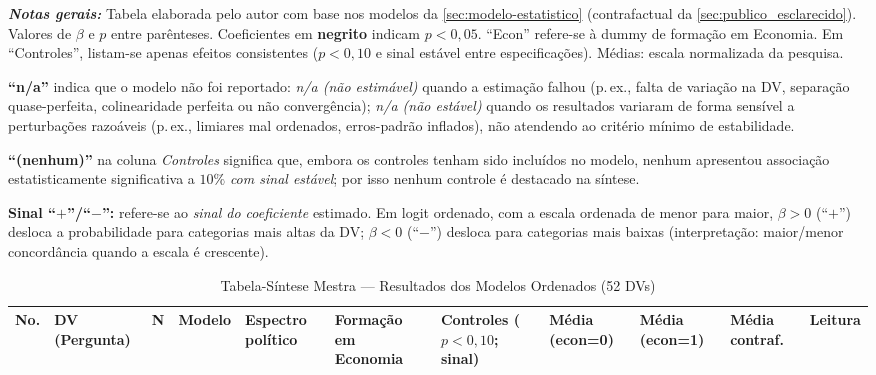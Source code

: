 \begin{apendicesenv}
\begin{landscape}
\begin{ThreePartTable}
\begin{TableNotes}[flushleft]\footnotesize
\item \textit{\textbf{Notas gerais:}} Tabela elaborada pelo autor com base nos modelos da \autoref{sec:modelo-estatistico} (contrafactual da \autoref{sec:publico_esclarecido}). \newline Valores de $\beta$ e $p$ entre parênteses. Coeficientes em \textbf{negrito} indicam $p<0{,}05$. ``Econ'' refere-se à dummy de formação em Economia. Em ``Controles'', listam-se apenas efeitos consistentes ($p<0{,}10$ e sinal estável entre especificações). Médias: escala normalizada da pesquisa.
\item \textbf{``n/a''} indica que o modelo não foi reportado: \textit{n/a (não estimável)} quando a estimação falhou (p.\,ex., falta de variação na DV, separação quase-perfeita, colinearidade perfeita ou não convergência); \textit{n/a (não estável)} quando os resultados variaram de forma sensível a perturbações razoáveis (p.\,ex., limiares mal ordenados, erros-padrão inflados), não atendendo ao critério mínimo de estabilidade.
\item \textbf{``(nenhum)''} na coluna \emph{Controles} significa que, embora os controles tenham sido incluídos no modelo, nenhum apresentou associação estatisticamente significativa a $10\%$ \emph{com sinal estável}; por isso nenhum controle é destacado na síntese.
\item \textbf{Sinal ``$+$''/``$-$'':} refere-se ao \emph{sinal do coeficiente} estimado. Em logit ordenado, com a escala ordenada de menor para maior, $\beta>0$ (``$+$'') desloca a probabilidade para categorias mais altas da DV; $\beta<0$ (``$-$'') desloca para categorias mais baixas (interpretação: maior/menor concordância quando a escala é crescente).
\end{TableNotes}

\begin{longtable}{%
  >{\centering\arraybackslash}p{0.5cm}
  >{\RaggedRight\arraybackslash}p{3.0cm}
  >{\centering\arraybackslash}p{0.6cm}
  >{\RaggedRight\arraybackslash}p{2cm}
  >{\RaggedRight\arraybackslash}p{3.5cm}
  >{\RaggedRight\arraybackslash}p{3.2cm}
  >{\RaggedRight\arraybackslash}p{3.2cm}
  >{\centering\arraybackslash}p{1.2cm}
  >{\centering\arraybackslash}p{1.2cm}
  >{\centering\arraybackslash}p{1.4cm}
  >{\RaggedRight\arraybackslash}p{4.5cm}}
\caption{Tabela-Síntese Mestra — Resultados dos Modelos Ordenados (52 DVs)}\label{tab:resultados_ordenados}\\
\toprule
\textbf{No.} & \textbf{DV (Pergunta)} & \textbf{N} & \textbf{Modelo} & \textbf{Espectro político} & \textbf{Formação em Economia} & \textbf{Controles ($p<0{,}10$; sinal)} & \textbf{Média (econ=0)} & \textbf{Média (econ=1)} & \textbf{Média contraf.} & \textbf{Leitura}\\
\midrule
\endfirsthead


\end{longtable}
\end{ThreePartTable}
\end{landscape}
\end{apendicesenv}
